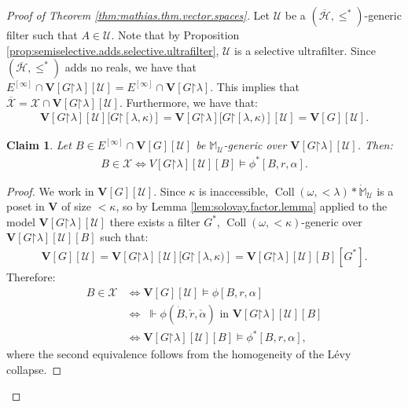 \documentclass[10pt,a4paper]{amsart}
\theoremstyle{plain}
\numberwithin{equation}{section}
\newtheorem{claim}{Claim}
\theoremstyle{definition}
\newcommand{\func}{\operatorname}
\renewcommand{\bar}[1]{\overline{#1}}
\newcommand{\cal}{\mathcal}
\renewcommand{\bf}{\mathbf}
\newcommand{\forces}{\Vdash}
\newcommand{\restrictedto}{\mathord{\upharpoonright}}
\newcommand{\Coll}{\func{Coll}}
\newcommand{\U}{\cal{U}}
\newcommand{\V}{\bf{V}}
\newcommand{\X}{\cal{X}}
\renewcommand{\H}{\cal{H}}
\newenvironment{midproof}[1][Proof]
  {\begin{proof}[#1]\renewcommand{\qedsymbol}{$\blacksquare$}}
  {\end{proof}}
\begin{document}
\begin{proof}[Proof of Theorem \ref{thm:mathias.thm.vector.spaces}]
    Let $\U$ be a $(\bar{\H},\leq^*)$-generic filter such that $A \in \U$. Note that by Proposition \ref{prop:semiselective.adds.selective.ultrafilter}, $\U$ is a selective ultrafilter. Since $(\bar{\H},\leq^*)$ adds no reals, we have that $E^{[\infty]} \cap \V[G\restrictedto\lambda][\U] = E^{[\infty]} \cap \V[G\restrictedto\lambda]$. This implies that $\bar{\X} = \X \cap \V[G\restrictedto\lambda][\U]$. Furthermore, we have that:
    \begin{align*}
        \V[G\restrictedto\lambda][\U][G\restrictedto[\lambda,\kappa)] = \V[G\restrictedto\lambda][G\restrictedto[\lambda,\kappa)][\U] = \V[G][\U].
    \end{align*}

    \begin{claim}
        Let $B \in E^{[\infty]} \cap \V[G][\U]$ be $\mathbb{M}_\U$-generic over $\V[G\restrictedto\lambda][\U]$. Then:
        \begin{align*}
            B \in \X \iff V[G\restrictedto\lambda][\U][B] \models \phi^*[B,r,\alpha].
        \end{align*}
    \end{claim}

    \begin{midproof}
        We work in $\V[G][\U]$. Since $\kappa$ is inaccessible, $\Coll(\omega,<\!\lambda) * \dot{\mathbb{M}}_\U$ is a poset in $\V$ of size $<\!\kappa$, so by Lemma \ref{lem:solovay.factor.lemma} applied to the model $\V[G\restrictedto\lambda][\U]$ there exists a filter $G^*$, $\Coll(\omega,<\!\kappa)$-generic over $\V[G\restrictedto\lambda][\U][B]$ such that:
        \begin{align*}
            \V[G][\U] = \V[G\restrictedto\lambda][\U][G\restrictedto[\lambda,\kappa)] = \V[G\restrictedto\lambda][\U][B][G^*].
        \end{align*}
        Therefore:
        \begin{align*}
            B \in \X &\iff \V[G][\U] \models \phi[B,r,\alpha] \\
            &\iff \;\forces \phi(\dot{B},\check{r},\check{\alpha}) \text{ in $\V[G\restrictedto\lambda][\U][B]$} \\
            &\iff \V[G\restrictedto\lambda][\U][B] \models \phi^*[B,r,\alpha],
        \end{align*}
        where the second equivalence follows from the homogeneity of the L\'{e}vy collapse.
    \end{midproof}
    

\end{proof}
\end{document}
